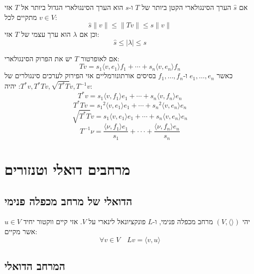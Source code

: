 \documentclass{tstextbook}
\begin{document}
\begin{proposition}
אם \(\hat{s}\) הערך הסינגולארי הקטן ביותר של \(T\) ו-\(s\) הוא הערך הסינגולארי הגדול ביותר אל \(T\) אזי מתקיים לכל \(v \in V\):
$$\hat{s}\lVert v \rVert \leq \lVert Tv \rVert \leq s\lVert v \rVert $$
וכן אם \(\lambda\) הוא ערך עצמי של \(T\) אזי:
$$\hat{s}\leq \left\lvert  \lambda  \right\rvert \leq s$$

\end{proposition}
\begin{proposition}
אם לאופרטור \(T\) יש את הפרוק הסינגולארי:
$$T v=s_{1}\langle v,e_{1}\rangle f_{1}+\cdots+s_{n}\langle v,e_{n}\rangle f_{n}$$
כאשר \(e_{1},\dots,e_{n}\) ו-\(f_{1},\dots,f_{n}\) בסיסים אורתונורמליים אזי הפירוק לערכים סינגולרים של \(T^{*}v,T^{*}Tv,\sqrt{ T^{*}T }v,T^{-1}v\): יהיה:
$$T^{*}v=s_{1}\langle v,f_{1}\rangle e_{1}+\cdots+s_{n}\langle v,f_{n}\rangle e_{n}$$$$T^{*}T v={s_{1}}^{2}\langle v,e_{1}\rangle e_{1}+\cdots+{s_{n}}^{2}\langle v,e_{n}\rangle e_{n}$$$${\sqrt{T^{*}T}}v=s_{1}\langle v,e_{1}\rangle e_{1}+\cdots+s_{n}\langle v,e_{n}\rangle e_{n}$$$$T^{-1}\nu=\frac{\langle\nu,f_{1}\rangle e_{1}}{s_{1}}+\cdot\cdot\cdot+\frac{\langle\nu,f_{n}\rangle e_{n}}{s_{n}}$$

\end{proposition}
\chapter{מרחבים דואלי וטנזורים}

\section{הדואלי של מרחב מכפלה פנימי}

\begin{theorem}
יהי \(\left( V,\langle  \rangle \right)\) מרחב מכפלה פנימי, ו-\(L\) פונקציונאל לינארי על \(V\). אזי קיים ווקטור יחיד \(u \in V\) אשר מקיים:
$$\forall v \in V\quad Lv = \langle v,u \rangle $$

\end{theorem}
\section{המרחב הדואלי}
\end{document}
